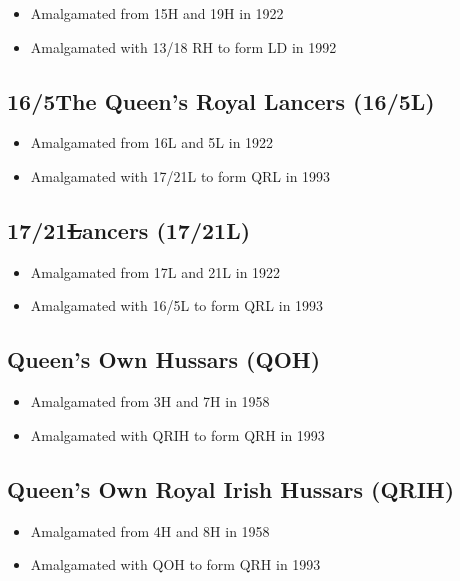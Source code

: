 \begin{itemize}
\item Amalgamated from 15H and 19H in 1922
\item Amalgamated with 13/18 RH to form LD in 1992
\end{itemize}

\subsection*{16\nth/5\nth The Queen's Royal Lancers (16/5L)}

\begin{itemize}
\item Amalgamated from 16L and 5L in 1922
\item Amalgamated with 17/21L to form QRL in 1993
\end{itemize}

\subsection*{17\nth/21\st Lancers (17/21L)}

\begin{itemize}
\item Amalgamated from 17L and 21L in 1922
\item Amalgamated with 16/5L to form QRL in 1993
\end{itemize}

\subsection*{Queen's Own Hussars (QOH)}

\begin{itemize}
\item Amalgamated from 3H and 7H in 1958
\item Amalgamated with QRIH to form QRH in 1993
\end{itemize}

\subsection*{Queen's Own Royal Irish Hussars (QRIH)}

\begin{itemize}
\item Amalgamated from 4H and 8H in 1958
\item Amalgamated with QOH to form QRH in 1993
\end{itemize}

